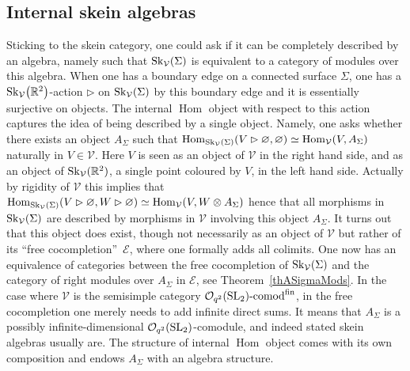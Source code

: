 \documentclass[pdftex]{sigma}%
\numberwithin{equation}{section}
\newcommand{\Hom}{\operatorname{Hom}}
\newcommand{\Oqcomfin}{\Oq\text{-}{\rm comod}^{\rm fin}}
\newcommand{\Oq}{\mathcal{O}_{q^2}({\rm SL}_2)}
\begin{document}
\subsection*{Internal skein algebras} Sticking to the skein category, one could ask if it can be completely described by an algebra, namely such that ${\rm Sk}_\mathcal{V}(\Sigma)$ is equivalent to a category of modules over this algebra. When one has a boundary edge on a connected surface $\Sigma$, one has a ${\rm Sk}_\mathcal{V}\big(\mathbb{R}^2\big)$-action $\rhd$ on ${\rm Sk}_\mathcal{V}(\Sigma)$ by this boundary edge and it is essentially surjective on objects. The internal $\Hom$ object with respect to this action captures the idea of being described by a single object. Namely, one asks whether there exists an object $A_\Sigma$ such that $\Hom_{{\rm Sk}_\mathcal{V}(\Sigma)}(V\rhd\varnothing,\varnothing) \simeq \Hom_{\mathcal{V}}(V, A_\Sigma)$ naturally in $V \in \mathcal{V}$. Here $V$ is seen as an object of $\mathcal{V}$ in the right hand side, and as an object of ${\rm Sk}_\mathcal{V}(\mathbb{R}^2)$, a single point coloured by $V$, in the left hand side. Actually by rigidity of $\mathcal{V}$ this implies that $\Hom_{{\rm Sk}_\mathcal{V}(\Sigma)}(V\rhd\varnothing,W \rhd \varnothing) \simeq \Hom_{\mathcal{V}}(V,W \otimes A_\Sigma)$ hence that all morphisms in ${\rm Sk}_\mathcal{V}(\Sigma)$ are described by morphisms in $\mathcal{V}$ involving this object $A_\Sigma$. It turns out that this object does exist, though not necessarily as an object of $\mathcal{V}$ but rather of its ``free cocompletion''~$\mathcal{E}$, where one formally adds all colimits. One now has an equivalence of categories between the free cocompletion of ${\rm Sk}_\mathcal{V}(\Sigma)$ and the category of right modules over $A_\Sigma$ in $\mathcal{E}$, see Theorem~\ref{thASigmaMods}. In the case where $\mathcal{V}$ is the semisimple category $\Oqcomfin$, in the free cocompletion one merely needs to add infinite direct sums. It means that $A_\Sigma$ is a possibly infinite-dimensional $\Oq$-comodule, and indeed stated skein algebras usually are. The structure of internal $\Hom$ object comes with its own composition and endows $A_\Sigma$ with an algebra structure.
\end{document}
